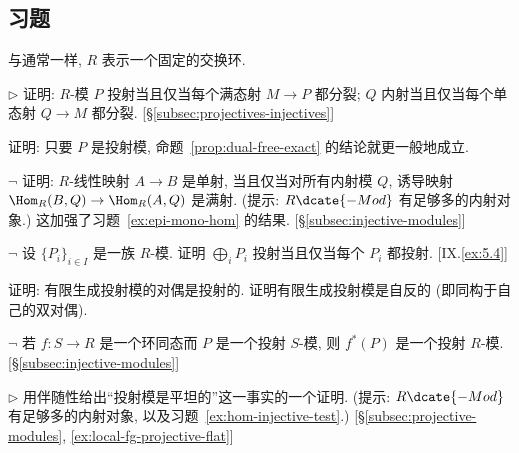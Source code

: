 \subsection*{习题}
{}

与通常一样, $R$ 表示一个固定的交换环.

\begin{prob}\label{ex:proj-inj-split}
$\triangleright$ 证明: $R$-模 $P$ 投射当且仅当每个满态射 $M\to P$ 都分裂; $Q$ 内射当且仅当每个单态射 $Q\to M$ 都分裂. [\S\ref{subsec:projectives-injectives}]
\end{prob}

\begin{prob}\label{ex:dual-free-exact-projective}
证明: 只要 $P$ 是投射模, 命题~\ref{prop:dual-free-exact} 的结论就更一般地成立.
\end{prob}

\begin{prob}\label{ex:hom-injective-test}
$\neg$ 证明: $R$-线性映射 $A\to B$ 是单射, 当且仅当对所有内射模 $Q$, 诱导映射 $\Hom_R(B,Q)\to\Hom_R(A,Q)$ 是满射. (提示: $R\dcate{-Mod}$ 有足够多的内射对象.) 这加强了习题~\ref{ex:epi-mono-hom} 的结果. [\S\ref{subsec:injective-modules}]
\end{prob}

\begin{prob}\label{ex:direct-sum-projective}
$\neg$ 设 $\{P_i\}_{i\in I}$ 是一族 $R$-模. 证明 $\bigoplus_i P_i$ 投射当且仅当每个 $P_i$ 都投射. [IX.\ref{ex:5.4}]
\end{prob}

\begin{prob}\label{ex:projective-dual-projective}
证明: 有限生成投射模的对偶是投射的. 证明有限生成投射模是自反的 (即同构于自己的双对偶).
\end{prob}

\begin{prob}\label{ex:restriction-projective}
$\neg$ 若 $f:S\to R$ 是一个环同态而 $P$ 是一个投射 $S$-模, 则 $f^*(P)$ 是一个投射 $R$-模. [\S\ref{subsec:injective-modules}]
\end{prob}

\begin{prob}\label{ex:projective-flat-adjunction}
$\triangleright$ 用伴随性给出``投射模是平坦的''这一事实的一个证明. (提示: $R\dcate{-Mod}$ 有足够多的内射对象, 以及习题~\ref{ex:hom-injective-test}.) [\S\ref{subsec:projective-modules}, \ref{ex:local-fg-projective-flat}]
\end{prob}

